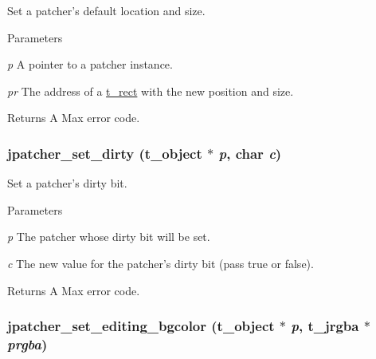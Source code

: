 Set a patcher's default location and size. 
\begin{DoxyParams}{Parameters}
\item[{\em p}]A pointer to a patcher instance. \item[{\em pr}]The address of a \hyperlink{structt__rect}{t\_\-rect} with the new position and size. \end{DoxyParams}
\begin{DoxyReturn}{Returns}
A Max error code. 
\end{DoxyReturn}
\hypertarget{group__jpatcher_gaad586555902f02618e3c3fa1f977d5a5}{
\subsubsection[{jpatcher\_\-set\_\-dirty}]{ jpatcher\_\-set\_\-dirty ({\bf t\_\-object} $\ast$ {\em p}, \/  char {\em c})}}
\label{group__jpatcher_gaad586555902f02618e3c3fa1f977d5a5}


Set a patcher's dirty bit. 
\begin{DoxyParams}{Parameters}
\item[{\em p}]The patcher whose dirty bit will be set. \item[{\em c}]The new value for the patcher's dirty bit (pass true or false). \end{DoxyParams}
\begin{DoxyReturn}{Returns}
A Max error code. 
\end{DoxyReturn}
\hypertarget{group__jpatcher_ga3e0e7d12c6e30c582fbd3da059eaca58}{
\subsubsection[{jpatcher\_\-set\_\-editing\_\-bgcolor}]{ jpatcher\_\-set\_\-editing\_\-bgcolor ({\bf t\_\-object} $\ast$ {\em p}, \/  {\bf t\_\-jrgba} $\ast$ {\em prgba})}}
\label{group__jpatcher_ga3e0e7d12c6e30c582fbd3da059eaca58}


